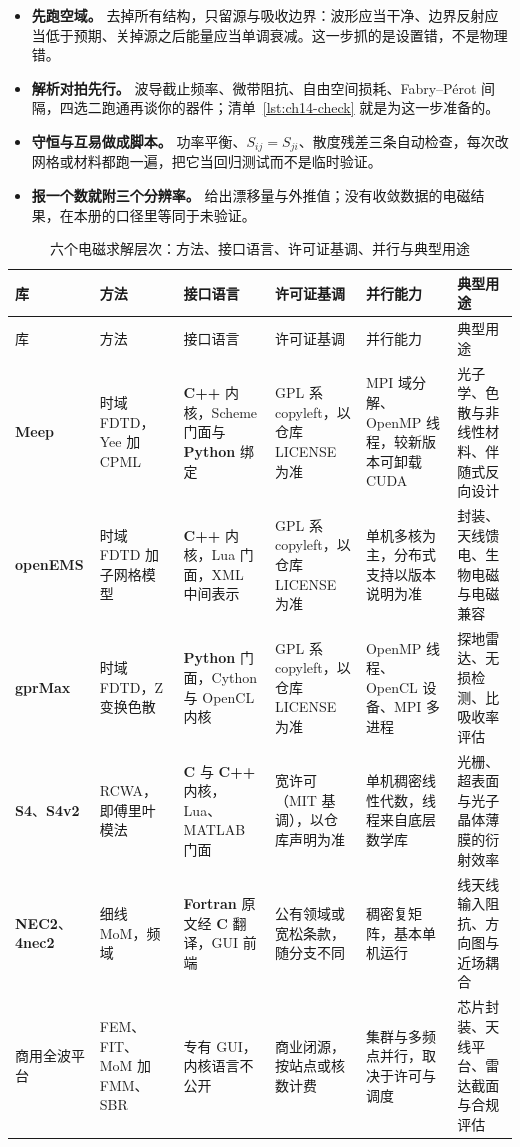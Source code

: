 \documentclass[12pt,a4paper,fontset=fandol]{ctexbook}
\newcommand{\Lib}[1]{\textbf{#1}}
\newcommand{\Lang}[1]{\textsf{\bfseries #1}}
\newcommand{\CL}{\Lang{C}}
\newcommand{\CPP}{\Lang{C++}}
\newcommand{\FTN}{\Lang{Fortran}}
\newcommand{\PY}{\Lang{Python}}
\begin{document}
\begin{bestpractice}[title={一次全波仿真的四道验收关}]
\begin{itemize}
\item \textbf{先跑空域。} 去掉所有结构，只留源与吸收边界：波形应当干净、边界反射应当低于预期、关掉源之后能量应当单调衰减。这一步抓的是设置错，不是物理错。
\item \textbf{解析对拍先行。} 波导截止频率、微带阻抗、自由空间损耗、Fabry--Pérot 间隔，四选二跑通再谈你的器件；清单~\ref{lst:ch14-check} 就是为这一步准备的。
\item \textbf{守恒与互易做成脚本。} 功率平衡、$S_{ij} = S_{ji}$、散度残差三条自动检查，每次改网格或材料都跑一遍，把它当回归测试而不是临时验证。
\item \textbf{报一个数就附三个分辨率。} 给出漂移量与外推值；没有收敛数据的电磁结果，在本册的口径里等同于未验证。
\end{itemize}
\end{bestpractice}

\begin{longtable}{@{}>{\raggedright\arraybackslash}p{}
  >{\raggedright\arraybackslash}p{}
  >{\raggedright\arraybackslash}p{}
  >{\raggedright\arraybackslash}p{}
  >{\raggedright\arraybackslash}p{}
  >{\raggedright\arraybackslash}p{}@{}}
\caption{六个电磁求解层次：方法、接口语言、许可证基调、并行与典型用途}\label{tab:ch14-solvers}\\
\toprule
库 & 方法 & 接口语言 & 许可证基调 & 并行能力 & 典型用途 \\
\midrule
\endfirsthead
\toprule
库 & 方法 & 接口语言 & 许可证基调 & 并行能力 & 典型用途 \\
\midrule
\endhead
\Lib{Meep} & 时域 FDTD，Yee 加 CPML &
  \CPP{} 内核，Scheme 门面与 \PY{} 绑定 &
  GPL 系 copyleft，以仓库 LICENSE 为准 &
  MPI 域分解、OpenMP 线程，较新版本可卸载 CUDA &
  光子学、色散与非线性材料、伴随式反向设计 \\
\Lib{openEMS} & 时域 FDTD 加子网格模型 &
  \CPP{} 内核，Lua 门面，XML 中间表示 &
  GPL 系 copyleft，以仓库 LICENSE 为准 &
  单机多核为主，分布式支持以版本说明为准 &
  封装、天线馈电、生物电磁与电磁兼容 \\
\Lib{gprMax} & 时域 FDTD，Z 变换色散 &
  \PY{} 门面，Cython 与 OpenCL 内核 &
  GPL 系 copyleft，以仓库 LICENSE 为准 &
  OpenMP 线程、OpenCL 设备、MPI 多进程 &
  探地雷达、无损检测、比吸收率评估 \\
\Lib{S4}、\Lib{S4v2} & RCWA，即傅里叶模法 &
  \CL{} 与 \CPP{} 内核，Lua、MATLAB 门面 &
  宽许可（MIT 基调），以仓库声明为准 &
  单机稠密线性代数，线程来自底层数学库 &
  光栅、超表面与光子晶体薄膜的衍射效率 \\
\Lib{NEC2}、\Lib{4nec2} & 细线 MoM，频域 &
  \FTN{} 原文经 \CL{} 翻译，GUI 前端 &
  公有领域或宽松条款，随分支不同 &
  稠密复矩阵，基本单机运行 &
  线天线输入阻抗、方向图与近场耦合 \\
商用全波平台 & FEM、FIT、MoM 加 FMM、SBR &
  专有 GUI，内核语言不公开 &
  商业闭源，按站点或核数计费 &
  集群与多频点并行，取决于许可与调度 &
  芯片封装、天线平台、雷达截面与合规评估 \\
\end{longtable}
\end{document}
